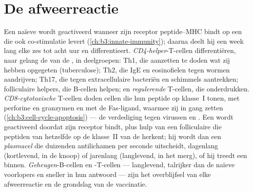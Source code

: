 \section{De afweerreactie}

\begin{definition}\label{def:b3:adaptive-immunity:response}
Een naïeve  wordt geactiveerd wanneer zijn receptor peptide--MHC
bindt op een  die ook co-stimulatie levert
(\cref{ch:b3:innate-immunity}); daarna deelt hij een week lang elke zes
tot acht uur en differentieert. \emph{CD4-helper}-T-cellen
differentiëren, naar gelang de  van de , in
deelgroepen: Th1, die  aanzetten te doden wat zij hebben
opgegeten (tuberculose); Th2, die IgE en eosinofielen tegen wormen
aandrijven; Th17, die  tegen extracellulaire bacteriën en
schimmels aantrekken; folliculaire helpers, die B-cellen helpen; en
\emph{regulerende} T-cellen, die onderdrukken. \emph{CD8-cytotoxische}
T-cellen doden cellen die hun peptide op klasse~I tonen, met perforine
en granzymen en met de Fas-ligand, waarmee zij  in gang zetten
(\cref{ch:b3:cell-cycle-apoptosis}) --- de verdediging tegen virussen
en . Een  wordt geactiveerd doordat  zijn receptor
bindt, plus hulp van een folliculaire  die peptiden van
hetzelfde  op de klasse~II van de  herkent; hij wordt dan
een \emph{plasmacel} die duizenden antilichamen per seconde
uitscheidt, dagenlang (kortlevend, in de knoop) of jarenlang
(langlevend, in het merg), of hij treedt een  binnen.
\emph{Geheugen}-B-cellen en -T-cellen --- langlevend, talrijker dan de
naïeve voorlopers en sneller in hun antwoord --- zijn het overblijfsel
van elke afweerreactie en de grondslag van de vaccinatie.
\end{definition}

